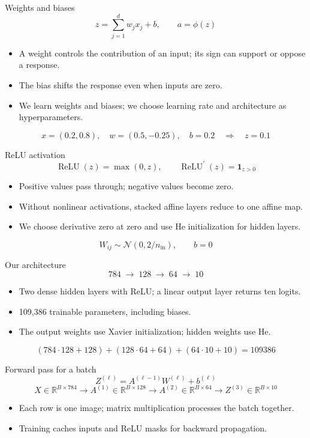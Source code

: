 \documentclass[aspectratio=169,10pt]{beamer}
\begin{document}
\begin{frame}{Weights and biases}
\[z=\sum_{j=1}^{d}w_jx_j+b,\qquad a=\phi(z)\]\begin{itemize}
\item A weight controls the contribution of an input; its sign can support or oppose a response.
\item The bias shifts the response even when inputs are zero.
\item We learn weights and biases; we choose learning rate and architecture as hyperparameters.
\end{itemize}
\[x=(0.2,0.8),\quad w=(0.5,-0.25),\quad b=0.2\quad\Rightarrow\quad z=0.1\]\end{frame}

\begin{frame}{ReLU activation}
\[\operatorname{ReLU}(z)=\max(0,z),\qquad \operatorname{ReLU}^{\prime}(z)=\mathbf{1}_{z>0}\]\begin{itemize}
\item Positive values pass through; negative values become zero.
\item Without nonlinear activations, stacked affine layers reduce to one affine map.
\item We choose derivative zero at zero and use He initialization for hidden layers.
\end{itemize}
\[W_{ij}\sim\mathcal{N}(0,2/n_{\mathrm{in}}),\qquad b=0\]\end{frame}

\begin{frame}{Our architecture}
\[784\;\longrightarrow\;128\;\longrightarrow\;64\;\longrightarrow\;10\]\begin{itemize}
\item Two dense hidden layers with ReLU; a linear output layer returns ten logits.
\item 109,386 trainable parameters, including biases.
\item The output weights use Xavier initialization; hidden weights use He.
\end{itemize}
\[(784\cdot128+128)+(128\cdot64+64)+(64\cdot10+10)=109386\]\end{frame}

\begin{frame}{Forward pass for a batch}
\[Z^{(\ell)}=A^{(\ell-1)}W^{(\ell)}+b^{(\ell)}\]\[X\in\mathbb{R}^{B\times784}\to A^{(1)}\in\mathbb{R}^{B\times128}\to A^{(2)}\in\mathbb{R}^{B\times64}\to Z^{(3)}\in\mathbb{R}^{B\times10}\]\begin{itemize}
\item Each row is one image; matrix multiplication processes the batch together.
\item Training caches inputs and ReLU masks for backward propagation.
\end{itemize}
\end{frame}
\end{document}
